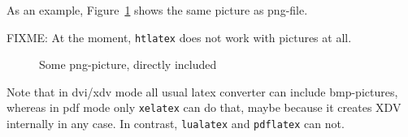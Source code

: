 As an example, Figure~\ref{fig:asIsPng} shows the same picture 
as png-file. 

FIXME\@: At the moment, \texttt{htlatex} does not work with pictures at all. 

\begin{figure}[htb]
\centering
{}
\caption{\label{fig:asIsPng}Some png-picture, directly included }
\end{figure}

Note that in dvi/xdv mode all usual latex converter 
can include bmp-pictures, whereas in pdf mode only \texttt{xelatex} 
can do that, maybe because it creates XDV internally in any case. 
In contrast, \texttt{lualatex} and \texttt{pdflatex} can not. 

  
